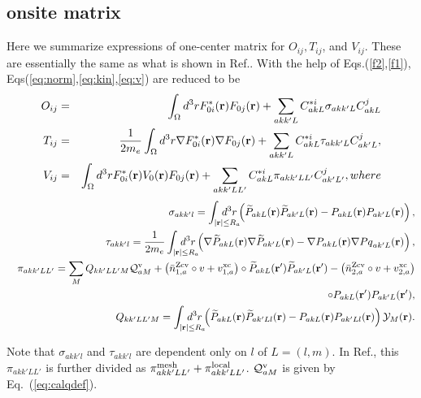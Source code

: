 \documentclass[twocolumn,showpacs,preprintnumbers,amsmath,amssymb,floatfix]{revtex4-1}
\newcommand{\bfr}{{\bf r}}
\newcommand{\YY}{{\cal Y}}
\newcommand{\req}[1]{\mbox{Eq.~\!(\ref{#1})}}
\def\barnzcv{\bar{n}^{\rm Zcv}}
\def\RR{w}
\def\inta{\int_{|\bfr|\leq R_a}\!\!\!\!\!\!\!\!\!\!\!\!}
\def\barnzcv{\bar{n}^{\rm Zcv}}
\def\RR{v}
\def\inta{\int_{|\bfr|\leq R_a}\!\!\!\!\!\!\!\!\!\!\!\!}
\begin{document}
\begin{widetext}
\section{onsite matrix}
\label{onsitematrix}
Here we summarize expressions of one-center matrix for $O_{ij},T_{ij}$, and
$V_{ij}$. These are essentially the same as what is shown in Ref.\cite{lmfchap}.
With the help of Eqs.(\ref{f2},\ref{f1}), Eqs(\ref{eq:norm},\ref{eq:kin},\ref{eq:v})
are reduced to be
\begin{eqnarray}
O_{ij} &=&\int_\Omega d^3r  F^*_{0i}(\bfr)F_{0j}(\bfr)
  + \sum_{akk'L} C^{*i}_{akL} \sigma_{akk'L} C^{j}_{akL}   \label{eq:normmat1}\\
T_{ij} &=&\frac{1}{2m_e}\int_\Omega d^3r  \nabla F^*_{0i}(\bfr) \nabla F_{0j}(\bfr)
  + \sum_{akk'L} C^{*i}_{akL} \tau_{akk'L} C^{j}_{ak'L},   \label{eq:kinmmat1}\\
V_{ij}&=&\int_\Omega d^3r  F^*_{0i}(\bfr)V_0(\bfr)F_{0j}(\bfr)
  + \sum_{akk'LL'} C^{*i}_{akL} \pi_{akk'LL'} C^{j}_{ak'L'} \label{eq:vpot},
where
\end{eqnarray}
\begin{eqnarray}
&&\sigma_{akk'l}= \inta d^3r  
 \left(\widetilde{P}_{akL}(\bfr) \widetilde{P}_{ak'L}(\bfr)
- {P}_{akL}(\bfr) {P}_{ak'L}(\bfr)\right), \label{matsig} \\
&&\tau_{akk'l}= \frac{1}{2m_e}\inta d^3r  
 \left(\nabla \widetilde{P}_{akL}(\bfr) \nabla \widetilde{P}_{ak'L}(\bfr)
-\nabla {P}_{akL}(\bfr) \nabla {Pq}_{ak'L}(\bfr)\right), \label{mattau}\\
&&\pi_{akk'LL'}= \sum_M Q_{kk'LL'M} {\cal Q}^{\rm v}_{aM} +
  \left(\barnzcv_{1,a} \circ \RR + v^{\rm xc}_{1,a} \right)\circ
  \widetilde{P}_{akL}(\bfr') \widetilde{P}_{ak'L}(\bfr')
- \left(\barnzcv_{2,a} \circ \RR + v^{\rm xc}_{2,a} \right) \nonumber \\
&&\circ
  {P}_{akL}(\bfr') {P}_{ak'L}(\bfr'), \label{matpi}\\
&&Q_{kk'LL'M}=\inta d^3r
\left( \widetilde{P}_{akL}(\bfr) \widetilde{P}_{ak'Ll}(\bfr)
- {P}_{akL}(\bfr) {P}_{ak'Ll}(\bfr)\right) \YY_M(\bfr) \label{qmom}. 
\end{eqnarray}
\end{widetext}
Note that $\sigma_{akk'l}$ and $\tau_{akk'l}$ are dependent only on
$l$ of $L=(l,m)$.
In Ref.\cite{lmfchap}, this $\pi_{akk'LL'}$ is further divided as
$\pi^{\rm mesh}_{akk'LL'} + \pi^{\rm local}_{akk'LL'}$.
${\cal Q}^{\rm v}_{aM}$ is given by \req{eq:calqdef}.

\end{document}
